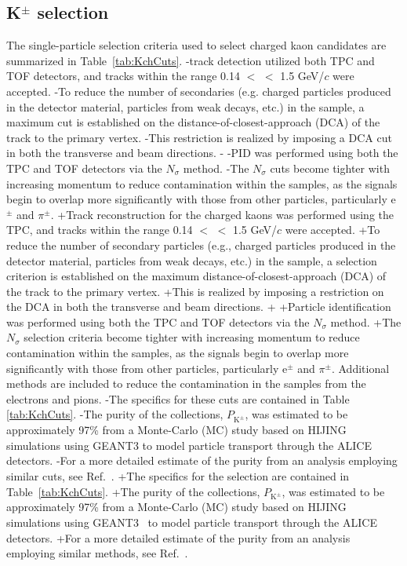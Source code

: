  \subsection{K$^{\pm}$ selection}
 \label{sec:KchSelection}
 The single-particle selection criteria used to select charged kaon candidates are summarized in Table~\ref{tab:KchCuts}.
-\Kpm track detection utilized both TPC and TOF detectors, and tracks within the range 0.14 $<$ \pt $<$ 1.5 GeV/$c$ were accepted.
-To reduce the number of secondaries (e.g. charged particles produced in the detector material, particles from weak decays, etc.) in the sample, a maximum cut is established on the distance-of-closest-approach (DCA) of the track to the primary vertex.
-This restriction is realized by imposing a DCA cut in both the transverse and beam directions.
-
-PID was performed using both the TPC and TOF detectors via the $N_{\sigma}$ method. 
-The $N_{\sigma}$ cuts become tighter with increasing momentum to reduce contamination within the samples, as the \Kpm signals begin to overlap more significantly with those from other particles, particularly e$^{\pm}$ and $\pi^{\pm}$.
+Track reconstruction for the charged kaons was performed using the TPC, and tracks within the range 0.14 $<$ \pt $<$ 1.5 GeV/$c$ were accepted.
+To reduce the number of secondary particles (e.g., charged particles produced in the detector material, particles from weak decays, etc.) in the sample, a selection criterion is established on the maximum distance-of-closest-approach (DCA) of the track to the primary vertex.
+This is realized by imposing a restriction on the DCA in both the transverse and beam directions.
+
+Particle identification was performed using both the TPC and TOF detectors via the $N_{\sigma}$ method. 
+The $N_{\sigma}$ selection criteria become tighter with increasing momentum to reduce contamination within the samples, as the \Kpm signals begin to overlap more significantly with those from other particles, particularly e$^{\pm}$ and $\pi^{\pm}$.
 Additional methods are included to reduce the contamination in the \Kpm samples from the electrons and pions.  
-The specifics for these cuts are contained in Table \ref{tab:KchCuts}.
-The purity of the \Kpm collections, $P_{\mathrm{K}^{\pm}}$, was estimated to be approximately 97\% from a Monte-Carlo (MC) study based on HIJING \cite{PhysRevD.44.3501} simulations using GEANT3 \cite{Brun:1994aa} to model particle transport through the ALICE detectors. 
-For a more detailed estimate of the \Kpm purity from an analysis employing similar cuts, see Ref.\ \cite{Acharya:2017qtq}.
+The specifics for the \Kpm selection are contained in Table~\ref{tab:KchCuts}.
+The purity of the \Kpm collections, $P_{\mathrm{K}^{\pm}}$, was estimated to be approximately 97\% from a Monte-Carlo (MC) study based on HIJING~\cite{PhysRevD.44.3501} simulations using GEANT3~\cite{Brun:1994aa} to model particle transport through the ALICE detectors. 
+For a more detailed estimate of the \Kpm purity from an analysis employing similar methods, see Ref.~\cite{Acharya:2017qtq}.
 
